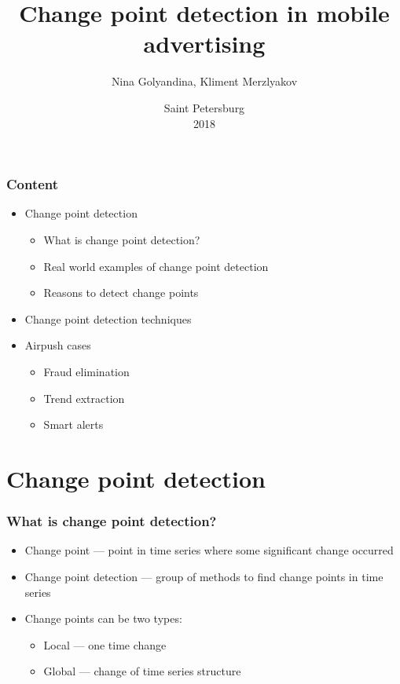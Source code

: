 \documentclass[intlimits, 9pt, unicode]{beamer}
\title{Change point detection in mobile advertising}
\author{Nina Golyandina, Kliment Merzlyakov}
\institute{Saint Petersburg State University \\
    Mathematical faculty \\
     Applied statistics department \\
}
\date{
    Saint Petersburg\\
    2018
}
\begin{document}
\begin{frame}
    \titlepage
\end{frame}

\begin{frame}
    \frametitle{Content}

    \begin{itemize}
    	\item Change point detection
		     	 \begin{itemize}
	    		   \item What is change point detection?
		    	   \item Real world examples of change point detection 
		    	   \item Reasons to detect change points
		    	  \end{itemize}
        \item Change point detection techniques
        \item Airpush cases
		     	 \begin{itemize}
	    		   \item Fraud elimination
		    	   \item Trend extraction
		    	   \item Smart alerts
		    	  \end{itemize}
    \end{itemize}
\end{frame}

\section{Change point detection}

\begin{frame}
    \frametitle{What is change point detection?}

    \begin{itemize}
    	\item Change point --- point in time series where some significant change occurred
	\item Change point detection --- group of methods to find change points in time series
	\item Change points can be two types:
		\begin{itemize}
			\item Local --- one time change
			\item Global --- change of time series structure 
		\end{itemize}
    \end{itemize}
\end{frame}
\end{document}
